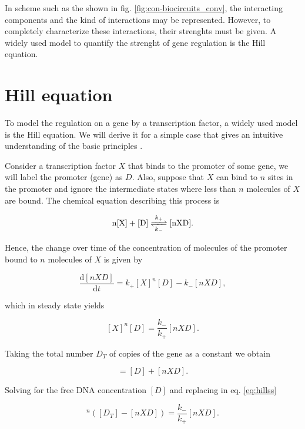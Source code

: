 In scheme such as the shown in fig. \ref{fig:con-biocircuits_conv}, the interacting components and the kind of interactions may be represented. However, to completely characterize these interactions, their strenghts must be given. A widely used model to quantify the strenght of gene regulation is the Hill equation.

\section{Hill equation}
\label{sec:hill}

To model the regulation on a gene by a transcription factor, a widely used model is the Hill equation. We will derive it for a simple case that gives an intuitive understanding of the basic principles \cite{alon06}.

Consider a transcription factor $X$ that binds to the promoter of some gene, we will label the promoter (gene) as $D$. Also, suppose that $X$ can bind to $n$ sites in the promoter and ignore the intermediate states where less than $n$ molecules of $X$ are bound. The chemical equation describing this process is

\begin{equation*}
  \ce{n[X] + [D]} \ce{<=>[k_+][k_-]} \ce{[nXD]}.
\end{equation*}

Hence, the change over time of the concentration of molecules of the promoter bound to $n$ molecules of $X$ is given by

\begin{equation*}
  \frac{\mathrm{d}[nXD]}{\mathrm{d}t} = k_+[X]^n[D] - k_-[nXD],
\end{equation*}

which in steady state yields

\begin{equation}
  \label{eq:hillss}
  [X]^n[D] = \frac{k_-}{k_+}[nXD].
\end{equation}

Taking the total number $D_T$ of copies of the gene as a constant we obtain

\begin{equation*}
  [D_T] = [D]+[nXD].
\end{equation*}

Solving for the free DNA concentration $[D]$ and replacing in eq. \eqref{eq:hillss}

\begin{equation*}
  [X]^n\left([D_T]-[nXD]\right) = \frac{k_-}{k_+}[nXD].
\end{equation*}

